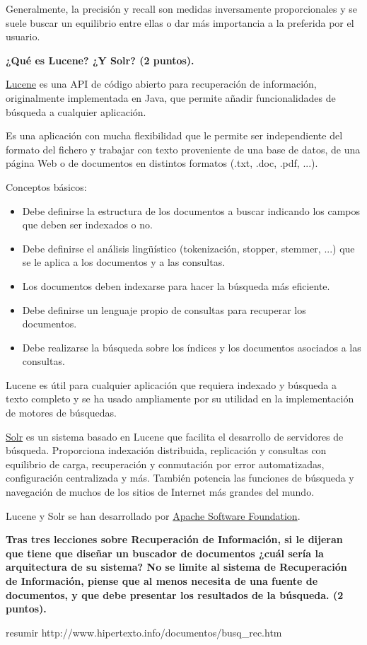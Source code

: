 \documentclass[11pt]{exam}
\begin{document}
\begin{questions}
Generalmente, la precisión y recall son medidas inversamente proporcionales y se suele buscar un equilibrio entre ellas o dar más importancia a la preferida por el usuario.

{\bf \question ¿Qué es Lucene? ¿Y Solr? (2 puntos).}

\href{https://lucene.apache.org/core/}{Lucene} es una API de código abierto para recuperación de información, originalmente implementada en Java, que permite añadir funcionalidades de búsqueda a cualquier aplicación. 

Es una aplicación con mucha flexibilidad que le permite ser independiente del formato del fichero y trabajar con texto proveniente de una base de datos, de una página Web o de documentos en distintos formatos (.txt, .doc, .pdf, ...).

Conceptos básicos:

\begin{itemize}
	\item Debe definirse la estructura de los documentos a buscar indicando los	campos que deben ser indexados o no.
	\item Debe definirse el análisis lingüístico (tokenización, stopper, stemmer, ...) que se le aplica a los documentos y a las consultas.
	\item Los documentos deben indexarse para hacer la búsqueda más eficiente.
	\item Debe definirse un lenguaje propio de consultas para recuperar los documentos.
	\item Debe realizarse la búsqueda sobre los índices y los documentos asociados a las consultas.
\end{itemize}

Lucene es útil para cualquier aplicación que requiera indexado y búsqueda a texto completo y se ha usado ampliamente por su utilidad en la implementación de motores de búsquedas.  

\href{https://lucene.apache.org/solr/}{Solr} es un sistema basado en Lucene que facilita el desarrollo de servidores de búsqueda. Proporciona indexación distribuida, replicación y consultas con equilibrio de carga, recuperación y conmutación por error automatizadas, configuración centralizada y más. También potencia las funciones de búsqueda y navegación de muchos de los sitios de Internet más grandes del mundo.

Lucene y Solr se han desarrollado por \href{http://www.apache.org/}{Apache Software Foundation}.

{\bf \question Tras tres lecciones sobre Recuperación de Información, si le dijeran que tiene que diseñar un buscador de documentos ¿cuál sería la arquitectura de su sistema? No se limite al sistema de Recuperación de Información, piense que al menos necesita de una fuente de documentos, y que debe presentar los resultados de la búsqueda. (2 puntos).}

resumir http://www.hipertexto.info/documentos/busq_rec.htm


\end{questions}
	
\end{document}
